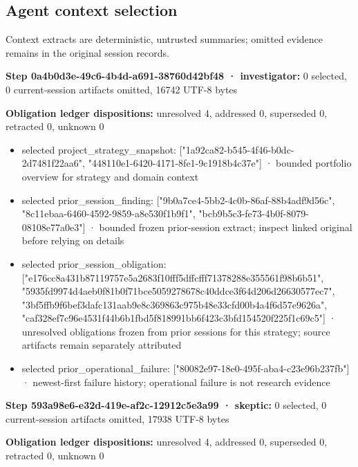 \documentclass[11pt]{article}
\begin{document}
\subsection{Agent context selection}
Context extracts are deterministic, untrusted summaries; omitted evidence remains in the original session records.\par
\textbf{Step 0a4b0d3e-49c6-4b4d-a691-38760d42bf48 · investigator:} 0 selected, 0 current-session artifacts omitted, 16742 UTF-8 bytes\par
\textbf{Obligation ledger dispositions:} unresolved 4, addressed 0, superseded 0, retracted 0, unknown 0\par
\begin{itemize}
\item selected project\_strategy\_snapshot: ["1a92ca82-b545-4f46-b0dc-2d7481f22aa6", "448110e1-6420-4171-8fe1-9c1918b4c37e"] · bounded portfolio overview for strategy and domain context
\item selected prior\_session\_finding: ["9b0a7ce4-5bb2-4c0b-86af-88b4adf9d56c", "8c11ebaa-6460-4592-9859-a8e530f1b9f1", "bcb9b5c3-fe73-4b0f-8079-08108e77a0e3"] · bounded frozen prior-session extract; inspect linked original before relying on details
\item selected prior\_session\_obligation: ["e176cc8a431b87119757e5a2683f10fff5dffcfff71378288e355561f98b6b51", "5935fd9974d4aeb0f81b0f71bce5059278678c40ddce3f64d206d26630577ec7", "3bf5ffb9f6bef3dafc131aab9e8c369863c975b48e33cfd00b4a4f6d57e9626a", "caf328ef7c96e4531f44b6b1fbd5f818991bb6f423c3bfd154520f225f1c69c5"] · unresolved obligations frozen from prior sessions for this strategy; source artifacts remain separately attributed
\item selected prior\_operational\_failure: ["80082e97-18e0-495f-aba4-c23e96b237fb"] · newest-first failure history; operational failure is not research evidence
\end{itemize}
\textbf{Step 593a98e6-e32d-419e-af2c-12912c5e3a99 · skeptic:} 0 selected, 0 current-session artifacts omitted, 17938 UTF-8 bytes\par
\textbf{Obligation ledger dispositions:} unresolved 4, addressed 0, superseded 0, retracted 0, unknown 0\par
\end{document}
